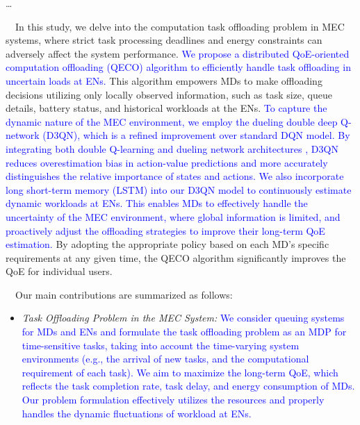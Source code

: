 \documentclass[12pt,draftclsnofoot,onecolumn]{IEEEtran}
\newcommand{\rev}[1]{{\color{blue}#1}} %
\newcommand{\rev}[1]{#1}
\newenvironment{my}[2]%
{\begin{list}{}%
{\setlength{\rightmargin}{#1}\setlength{\leftmargin}{#2}}%


 \item[]{}

} {\end{list}}
\begin{document}
\begin{enumerate}
		\begin{my}{1cm}{1cm}
	\rev{
		{\dots\
			
			\color{black}


\,\,\,\,
In this study, we delve into the computation task offloading problem in MEC systems, where strict task processing deadlines and energy constraints can adversely affect the system performance.   \textcolor{blue}{We propose a distributed QoE-oriented computation offloading (QECO) algorithm to efficiently handle task offloading in uncertain loads at ENs.} This algorithm empowers MDs to make offloading decisions utilizing only locally observed information, such as task size, queue details, battery status, and historical workloads at the ENs. 
\textcolor{blue}{To capture the dynamic nature of the MEC environment, we employ the dueling double deep Q-network (D3QN), which is a refined improvement over standard DQN model. By integrating both double Q-learning \cite{van2016deep} and dueling network architectures \cite{wang2016dueling}, D3QN reduces overestimation bias in action-value predictions and more accurately distinguishes the relative importance of states and actions. We also incorporate long short-term memory (LSTM) \cite{hochreiter1997long} into our D3QN model to continuously estimate dynamic workloads at ENs. This enables MDs to effectively handle the uncertainty of the MEC environment, where global information is limited, and proactively adjust the offloading strategies to improve their long-term QoE estimation.} By adopting the appropriate policy based on each MD’s specific requirements at any given time, the QECO algorithm significantly improves the QoE for individual users. \vspace{3mm}

\,\,\,\,
Our main contributions are summarized as follows:

\begin{itemize}
	\item \textit{Task Offloading Problem in the MEC System:} \textcolor{blue}{ We consider queuing systems for MDs and ENs and formulate the task offloading problem as an MDP for time-sensitive tasks, taking into account the time-varying system environments (e.g., the arrival of new tasks, and the computational requirement of each task). We aim to maximize the long-term QoE, which reflects the task completion rate, task delay, and energy consumption of MDs. Our problem formulation effectively utilizes the resources and properly handles the dynamic fluctuations of workload at ENs. }
	


\end{itemize}}}
\end{my}
\end{enumerate}
\end{document}
